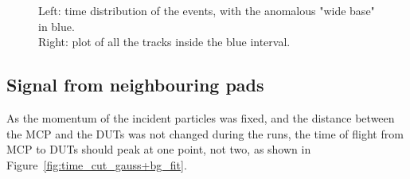 \begin{figure}[h!tbp]
    \centering
    \hfill
    \captionsetup{width=\captionwidth}
    \caption{Left: time distribution of the events, with the anomalous "wide base" in blue. \\
    Right: plot of all the tracks inside the blue interval.}
    \label{fig:time_difference_wide_gaussian}
\end{figure}


\subsection{Signal from neighbouring pads}\label{sec:multiple_peaks}

As the momentum of the incident particles was fixed, and the distance between the MCP and the DUTs was not changed during the runs, the time of flight from MCP to DUTs should peak at one point, not two, as shown in Figure~\ref{fig:time_cut_gauss+bg_fit}. 

